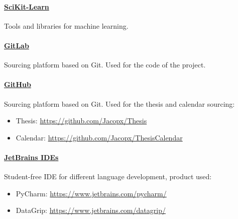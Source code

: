 \documentclass[%
    corpo=12pt,
    twoside,
    oldstyle,
    autoretitolo,
    greek,
    evenboxes,
]{toptesi}
\begin{document}
\paragraph{\href{https://scikit-learn.org/stable/}{SciKit-Learn}} Tools and libraries for machine learning.

\paragraph{\href{https://gitlab.com}{GitLab}} Sourcing platform based on Git. Used for the code of the project.

\paragraph{\href{https://github.com}{GitHub}} Sourcing platform based on Git. Used for the thesis and calendar sourcing:
\begin{itemize}
  \item Thesis: \url{https://github.com/Jacopx/Thesis}
  \item Calendar: \url{https://github.com/Jacopx/ThesisCalendar}
\end{itemize}

\paragraph{\href{https://www.jetbrains.com/}{JetBrains IDEs}} Student-free IDE for different language development, product used:
\begin{itemize}
  \item PyCharm: \url{https://www.jetbrains.com/pycharm/}
  \item DataGrip: \url{https://www.jetbrains.com/datagrip/}
\end{itemize}


\end{document}
